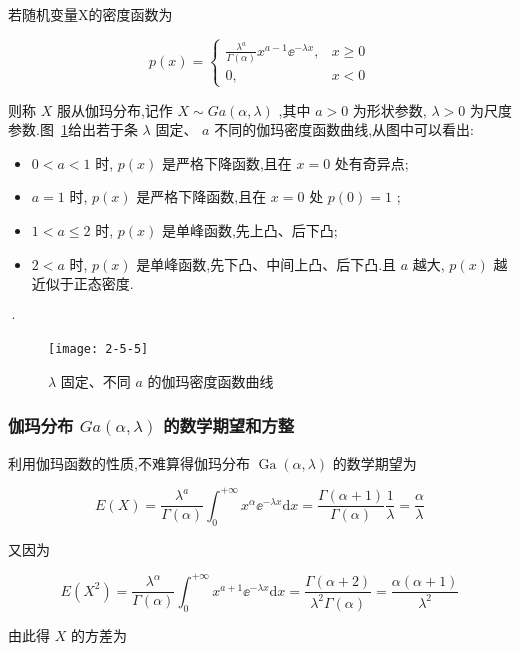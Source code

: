 若随机变量X的密度函数为

\begin{equation}
p(x)=\left\{\begin{array}{ll}{\frac{\lambda^{a}}{\Gamma(\alpha)} x^{a-1} \ee ^{-\lambda x},} & {x \geqslant 0} \\ {0,} & {x<0}\end{array}\right. \label{eq:2.5.12}
\end{equation}

则称 $ X $ 服从伽玛分布,记作 $ X \sim G a(\alpha, \lambda) $ ,其中 $ a>0 $ 为形状参数, $ \lambda>0 $ 为尺度参数.图~\ref{fig:2-5-5}给出若于条 $ \lambda $ 固定、 $ a $ 不同的伽玛密度函数曲线,从图中可以看出:

\begin{itemize}
	\item $ 0<a<1 $ 时, $ p(x) $ 是严格下降函数,且在 $ x=0 $ 处有奇异点;
	\item $ a=1 $ 时, $ p(x) $ 是严格下降函数,且在 $ x=0 $ 处 $ p(0)=1 $ ;
	\item $ 1<a \leq 2 $ 时, $ p(x) $ 是单峰函数,先上凸、后下凸;
	\item $ 2<a $ 时, $ p(x) $ 是单峰函数,先下凸、中间上凸、后下凸.且 $ a $ 越大, $ p(x) $ 越近似于正态密度.
\end{itemize}
·
\begin{figure}
	\centering
	\texttt{[image: 2-5-5]}
	\caption{ $ \lambda $ 固定、不同 $ a $ 的伽玛密度函数曲线}
	\label{fig:2-5-5}
\end{figure}

\subsubsection{伽玛分布 $ G a(\alpha, \lambda) $ 的数学期望和方整}

利用伽玛函数的性质,不难算得伽玛分布 $ \operatorname{Ga}(\alpha, \lambda) $ 的数学期望为

\[
E(X)=\frac{\lambda^{a}}{\Gamma(\alpha)} \int_{0}^{+\infty} x^{\alpha} \ee ^{-\lambda x} \mathrm{d} x=\frac{\Gamma(\alpha+1)}{\Gamma(\alpha)} \frac{1}{\lambda}=\frac{\alpha}{\lambda}
\]

又因为

\[
E\left(X^{2}\right)=\frac{\lambda^{\alpha}}{\Gamma(\alpha)} \int_{0}^{+\infty} x^{a+1} \ee ^{-\lambda x} \mathrm{d} x=\frac{\Gamma(\alpha+2)}{\lambda^{2} \Gamma(\alpha)}=\frac{\alpha(\alpha+1)}{\lambda^{2}}
\]

由此得 $ X $ 的方差为

